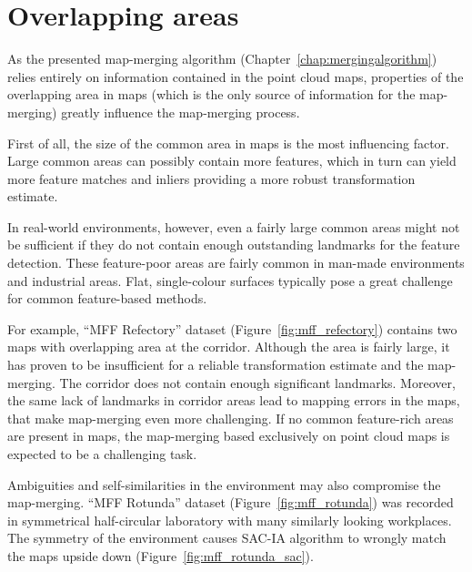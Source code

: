 \section{Overlapping areas}
\label{sec:mff-evaluation}

As the presented map-merging algorithm (Chapter~\ref{chap:mergingalgorithm}) relies entirely on information contained in the point cloud maps, properties of the overlapping area in maps (which is the only source of information for the map-merging) greatly influence the map-merging process.

First of all, the size of the common area in maps is the most influencing factor. Large common areas can possibly contain more features, which in turn can yield more feature matches and inliers providing a more robust transformation estimate.

In real-world environments, however, even a fairly large common areas might not be sufficient if they do not contain enough outstanding landmarks for the feature detection. These feature-poor areas are fairly common in man-made environments and industrial areas. Flat, single-colour surfaces typically pose a great challenge for common feature-based methods.

For example, ``MFF Refectory'' dataset (Figure~\ref{fig:mff_refectory}) contains two maps with overlapping area at the corridor. Although the area is fairly large, it has proven to be insufficient for a reliable transformation estimate and the map-merging. The corridor does not contain enough significant landmarks. Moreover, the same lack of landmarks in corridor areas lead to mapping errors in the maps, that make map-merging even more challenging. If no common feature-rich areas are present in maps, the map-merging based exclusively on point cloud maps is expected to be a challenging task.

Ambiguities and self-similarities in the environment may also compromise the map-merging. ``MFF Rotunda'' dataset (Figure~\ref{fig:mff_rotunda}) was recorded in symmetrical half-circular laboratory with many similarly looking workplaces. The symmetry of the environment causes \gls{SAC-IA} algorithm to wrongly match the maps upside down (Figure~\ref{fig:mff_rotunda_sac}).

